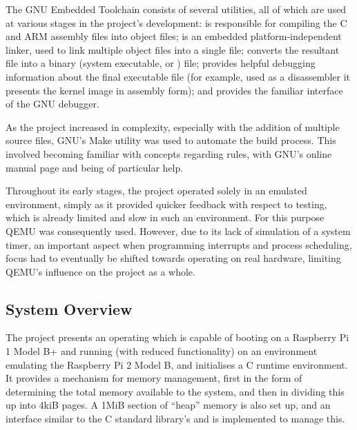         The GNU Embedded Toolchain consists of several utilities, all of which
        are used at various stages in the project's development:
         is responsible for compiling the C and ARM
        assembly files into object files;  is an embedded
        platform-independent linker, used to link multiple object files into a
        single  file;  converts the
        resultant  file into a binary (system executable, or
        ) file;  provides helpful
        debugging information about the final executable file (for example, used
        as a disassembler it presents the kernel image in assembly form); and
         provides the familiar interface of the GNU
        debugger.

        As the project increased in complexity, especially with the addition of
        multiple source files, GNU's Make utility was used to automate the build
        process. This involved becoming familiar with concepts regarding rules,
        with GNU's online manual page \cite{MakeManual} and \cite{MakeVariables}
        being of particular help.

        Throughout its early stages, the project operated solely in an emulated
        environment, simply as it provided quicker feedback with respect to
        testing, which is already limited and slow in such an environment.
        For this purpose QEMU was consequently used. However, due to its lack of
        simulation of a system timer, an important aspect when programming
        interrupts and process scheduling, focus had to eventually be shifted
        towards operating on real hardware, limiting QEMU's influence on the
        project as a whole.
 
\subsection{System Overview}
    The project presents an operating which is capable of booting on a Raspberry
    Pi 1 Model B+ and running (with reduced functionality) on an environment
    emulating the Raspberry Pi 2 Model B, and initialises a C runtime
    environment. It provides a mechanism for memory management, first in the
    form of determining the total memory available to the system, and then in
    dividing this up into 4kiB pages. A 1MiB section of ``heap'' memory is also
    set up, and an interface similar to the C standard library's 
    and  is implemented to manage this.

